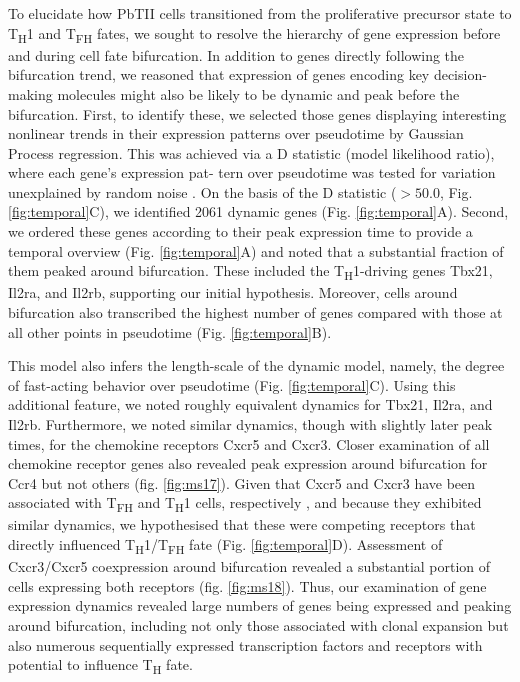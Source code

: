 To elucidate how PbTII cells transitioned from the proliferative precursor state to T\textsubscript{H}1 and T\textsubscript{FH} fates, we sought to resolve the hierarchy of gene expression before and during cell fate bifurcation. In addition to genes directly following the bifurcation trend, we reasoned that expression of genes encoding key decision-making molecules might also be likely to be dynamic and peak before the bifurcation. First, to identify these, we selected those genes displaying interesting nonlinear trends in their expression patterns over pseudotime by Gaussian Process regression. This was achieved via a D statistic (model likelihood ratio), where each gene’s expression pat- tern over pseudotime was tested for variation unexplained by random noise \cite{Macaulay2016-zd}. On the basis of the D statistic (\( > 50.0 \), Fig. \ref{fig:temporal}C), we identified 2061 dynamic genes (Fig. \ref{fig:temporal}A). Second, we ordered these genes according to their peak expression time to provide a temporal overview (Fig. \ref{fig:temporal}A) and noted that a substantial fraction of them peaked around bifurcation. These included the T\textsubscript{H}1-driving genes Tbx21, Il2ra, and Il2rb, supporting our initial hypothesis. Moreover, cells around bifurcation also transcribed the highest number of genes compared with those at all other points in pseudotime (Fig. \ref{fig:temporal}B).

This model also infers the length-scale of the dynamic model, namely, the degree of fast-acting behavior over pseudotime (Fig. \ref{fig:temporal}C). Using this additional feature, we noted roughly equivalent dynamics for Tbx21, Il2ra, and Il2rb. Furthermore, we noted similar dynamics, though with slightly later peak times, for the chemokine receptors Cxcr5 and Cxcr3. Closer examination of all chemokine receptor genes also revealed peak expression around bifurcation for Ccr4 but not others (fig. \ref{fig:ms17}). Given that Cxcr5 and Cxcr3 have been associated with T\textsubscript{FH} and T\textsubscript{H}1 cells, respectively \cite{Groom2012-az, Breitfeld2000-yk, Schaerli2000-hl}, and because they exhibited similar dynamics, we hypothesised that these were competing receptors that directly influenced T\textsubscript{H}1/T\textsubscript{FH} fate (Fig. \ref{fig:temporal}D). Assessment of Cxcr3/Cxcr5 coexpression around bifurcation revealed a substantial portion of cells expressing both receptors (fig. \ref{fig:ms18}). Thus, our examination of gene expression dynamics revealed large numbers of genes being expressed and peaking around bifurcation, including not only those associated with clonal expansion but also numerous sequentially expressed transcription factors and receptors with potential to influence T\textsubscript{H} fate.

